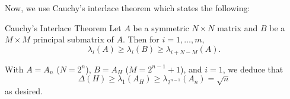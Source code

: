 Now, we use Cauchy's interlace theorem which states the following:

\begin{theorem*}{Cauchy's Interlace Theorem}{}
Let $A$ be a symmetric $N\times N$ matrix and $B$ be a $M\times M$ principal submatrix of $A$. Then for $i=1,\ldots,m$, \[\lambda_i(A)\geq\lambda_i(B)\geq\lambda_{i+N-M}(A).\]
\end{theorem*}

With $A=A_n$ ($N=2^n$), $B=A_H$ ($M=2^{n-1}+1$), and $i=1$, we deduce that \[\Delta(H)\geq\lambda_1(A_H)\geq\lambda_{2^{n-1}}(A_n)=\sqrt{n}\] as desired.
